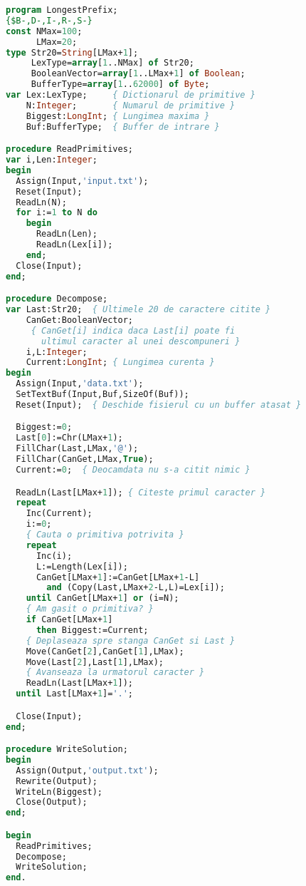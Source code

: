 \begin{lstlisting}[language=Pascal]
program LongestPrefix;
{$B-,D-,I-,R-,S-}
const NMax=100;
      LMax=20;
type Str20=String[LMax+1];
     LexType=array[1..NMax] of Str20;
     BooleanVector=array[1..LMax+1] of Boolean;
     BufferType=array[1..62000] of Byte;
var Lex:LexType;     { Dictionarul de primitive }
    N:Integer;       { Numarul de primitive }
    Biggest:LongInt; { Lungimea maxima }
    Buf:BufferType;  { Buffer de intrare }

procedure ReadPrimitives;
var i,Len:Integer;
begin
  Assign(Input,'input.txt');
  Reset(Input);
  ReadLn(N);
  for i:=1 to N do
    begin
      ReadLn(Len);
      ReadLn(Lex[i]);
    end;
  Close(Input);
end;

procedure Decompose;
var Last:Str20;  { Ultimele 20 de caractere citite }
    CanGet:BooleanVector;
     { CanGet[i] indica daca Last[i] poate fi
       ultimul caracter al unei descompuneri }
    i,L:Integer;
    Current:LongInt; { Lungimea curenta }
begin
  Assign(Input,'data.txt');
  SetTextBuf(Input,Buf,SizeOf(Buf));
  Reset(Input);  { Deschide fisierul cu un buffer atasat }

  Biggest:=0;
  Last[0]:=Chr(LMax+1);
  FillChar(Last,LMax,'@');
  FillChar(CanGet,LMax,True);
  Current:=0;  { Deocamdata nu s-a citit nimic }

  ReadLn(Last[LMax+1]); { Citeste primul caracter }
  repeat
    Inc(Current);
    i:=0;
    { Cauta o primitiva potrivita }
    repeat
      Inc(i);
      L:=Length(Lex[i]);
      CanGet[LMax+1]:=CanGet[LMax+1-L]
        and (Copy(Last,LMax+2-L,L)=Lex[i]);
    until CanGet[LMax+1] or (i=N);
    { Am gasit o primitiva? }
    if CanGet[LMax+1]
      then Biggest:=Current;
    { Deplaseaza spre stanga CanGet si Last }
    Move(CanGet[2],CanGet[1],LMax);
    Move(Last[2],Last[1],LMax);
    { Avanseaza la urmatorul caracter }
    ReadLn(Last[LMax+1]);
  until Last[LMax+1]='.';

  Close(Input);
end;

procedure WriteSolution;
begin
  Assign(Output,'output.txt');
  Rewrite(Output);
  WriteLn(Biggest);
  Close(Output);
end;

begin
  ReadPrimitives;
  Decompose;
  WriteSolution;
end.
\end{lstlisting}
